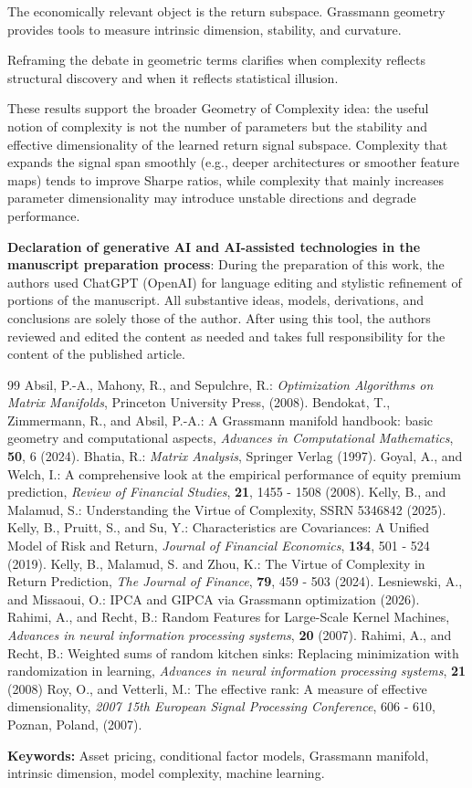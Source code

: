 \documentclass[twoside,11pt,letter]{article}
\begin{document}
The economically relevant object is the return subspace. Grassmann geometry provides tools to measure intrinsic dimension, stability, and curvature.

Reframing the debate in geometric terms clarifies when complexity reflects structural discovery and when it reflects statistical illusion. 

These results support the broader Geometry of Complexity idea: the useful notion of complexity is not the number of parameters but the stability and effective dimensionality of the learned return signal subspace. Complexity that expands the signal span smoothly (e.g., deeper architectures or smoother feature maps) tends to improve Sharpe ratios, while complexity that mainly increases parameter dimensionality may introduce unstable directions and degrade performance.

\medskip\noindent
\textbf{Declaration of generative AI and AI-assisted technologies in the manuscript preparation process}: During the preparation of this work, the authors used ChatGPT (OpenAI) for language editing and stylistic refinement of portions of the manuscript. All substantive ideas, models, derivations, and conclusions are solely those of the author. After using this tool, the authors reviewed and edited the content as needed and takes full responsibility for the content of the published article.

\begin{thebibliography}{99}
 Absil, P.-A., Mahony, R., and Sepulchre, R.: \emph{Optimization Algorithms on Matrix Manifolds}, Princeton University Press, (2008).
 Bendokat, T., Zimmermann, R., and Absil, P.-A.:  A Grassmann manifold handbook: basic geometry and computational aspects, \emph{Advances in Computational Mathematics}, \textbf{50}, 6 (2024).
 Bhatia, R.: \emph{Matrix Analysis}, Springer Verlag (1997).
 Goyal, A., and Welch, I.: A comprehensive look at the empirical performance of equity premium prediction, \textit{Review of Financial Studies}, \textbf{21}, 1455 - 1508 (2008).
 Kelly, B., and Malamud, S.: Understanding the Virtue of Complexity, SSRN 5346842 (2025).
 Kelly, B., Pruitt, S., and Su, Y.: Characteristics are Covariances: A Unified Model of Risk and Return, \emph{Journal of Financial Economics}, \textbf{134}, 501 - 524 (2019).
 Kelly, B., Malamud, S. and Zhou, K.: The Virtue of Complexity in Return Prediction, \textit{The Journal of Finance}, \textbf{79}, 459 - 503 (2024).
 Lesniewski, A., and Missaoui, O.: IPCA and GIPCA via Grassmann optimization (2026).
 Rahimi, A., and Recht, B.: Random Features for Large-Scale Kernel Machines, \textit{Advances in neural information processing systems}, \textbf{20} (2007).
 Rahimi, A., and Recht, B.: Weighted sums of random kitchen sinks: Replacing minimization with randomization in learning, \textit{Advances in neural information processing systems}, \textbf{21} (2008)
 Roy, O., and Vetterli, M.: The effective rank: A measure of effective dimensionality, \emph{2007 15th European Signal Processing Conference}, 606 - 610, Poznan, Poland, (2007).
\end{thebibliography}

\bigskip\noindent
\textbf{Keywords:} Asset pricing, conditional factor models, Grassmann manifold, intrinsic dimension, model complexity, machine learning.
\end{document}
